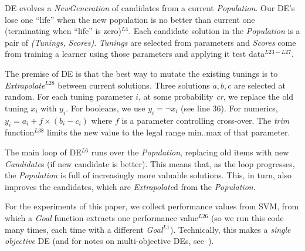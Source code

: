 DE evolves a {\em NewGeneration} of candidates  from
a current {\em Population}.  Our DE's lose one ``life''
when the new population is no better than  current one (terminating when ``life'' is zero)$^{L4}$.
Each candidate solution in the {\em Population}  
is a pair of {\em (Tunings, Scores)}.  {\em Tunings} are selected from
{parameters} and {\em Scores} come from training a learner using those parameters
and applying it     test data$^{L23-L27}$.

The premise of DE  is that the best way to mutate the existing tunings
is to {\em Extrapolate}$^{L28}$
between current solutions.  Three solutions $a,b,c$ are selected at random.
For each tuning parameter $i$, at some probability {\em cr}, we replace
the old tuning $x_i$ with $y_i$. For booleans, we use $y_i= \neg x_i$ (see line 36). For numerics, $y_i = a_i+f \times (b_i - c_i)$   where $f$ is a parameter
controlling  cross-over.  The {\em trim} function$^{L38}$ limits the new
value to the legal range min..max of that parameter.
 
The main loop of DE$^{L6}$ runs over the {\em Population}, replacing old items
with new {\em Candidate}s (if  new candidate is better).
This means that, as the loop progresses, the {\em Population} is full of increasingly
more valuable solutions. This, in turn, also improves  the candidates, which are {\em Extrapolate}d
from the {\em Population}.

For the experiments of this paper, we collect performance
values from SVM, from which a {\em Goal} function extracts one 
performance value$^{L26}$ (so we run this code many times, each time with
a different {\em Goal}$^{L1}$).  Technically, this makes a  {\em single objective} DE 
(and for notes on multi-objective DEs, see~\cite{robivc2005demo,zhang2007moea,huang2010differential}).


